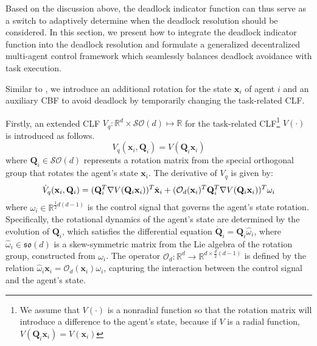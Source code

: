 \documentclass[letterpaper, 10 pt, conference]{ieeeconf}
\theoremstyle{plain}
\begin{document}
Based on the discussion above, the deadlock indicator function can thus serve as a switch to adaptively determine when the deadlock resolution should be considered. In this section, we present how to integrate the deadlock indicator function into the deadlock resolution and formulate a generalized decentralized multi-agent control framework which seamlessly balances deadlock avoidance with task execution.

Similar to \cite{reis2020control}, we introduce an additional rotation
for the state $\mathbf{x}_i$ of agent $i$ and an auxiliary CBF to avoid deadlock by temporarily changing the task-related CLF.

Firstly, an extended CLF
$V_q: \mathbb{R}^d \times \mathcal{SO}(d) \mapsto \mathbb{R}$
for the task-related CLF\footnote{We assume that $V(\cdot)$ is a nonradial function so that the rotation matrix will introduce a difference to the agent's state, because if $V$ is a radial function, $V(\mathbf{Q}_i\mathbf{x}_i) = V(\mathbf{x}_i)$} $V(\cdot)$ is introduced as follows.
{\small\begin{equation} \label{eq:Vq}
    V_q(\mathbf{x}_i, \mathbf{Q}_i) = V(\mathbf{Q}_i\mathbf{x}_i)
\end{equation}}
where $\mathbf{Q}_i \in \mathcal{SO}(d)$ represents a rotation matrix from the special orthogonal group that rotates the agent’s state $\mathbf{x}_i$. The derivative of $V_q$ is given by:
{\small
\begin{equation}
    \dot{V}_q(\mathbf{x}_i, \mathbf{Q}_i) = (\mathbf{Q}_i^{T}\nabla V(\mathbf{Q}_i\mathbf{x}_i))^{T}\dot{\mathbf{x}}_i + (\mathcal{O}_d(\mathbf{x}_i)^{T}\mathbf{Q}_i^{T}\nabla V(\mathbf{Q}_i\mathbf{x}_i))^{T}\omega_i \notag
\end{equation}}
where $\omega_i \in \mathbb{R}^{\frac{1}{2} d(d-1)}$ is the control signal that governs the agent’s state rotation. Specifically, the rotational dynamics of the agent’s state are determined by the evolution of $\mathbf{Q}_i$, which satisfies the differential equation
$\dot{\mathbf{Q}}_i = \mathbf{Q}_i \hat{\omega}_i$,
where $\hat{\omega}_i \in \mathfrak{so}(d)$ is a skew-symmetric matrix from the Lie algebra of the rotation group, constructed from $\omega_i$. 
The operator $\mathcal{O}_d : \mathbb{R}^d \rightarrow \mathbb{R}^{d \times \frac{d}{2} (d-1)}$ is defined by the
relation $\hat{\omega}_i \mathbf{x}_i = \mathcal{O}_d(\mathbf{x}_i)\omega_i$, capturing the interaction between the control signal and the agent's state.
\end{document}
